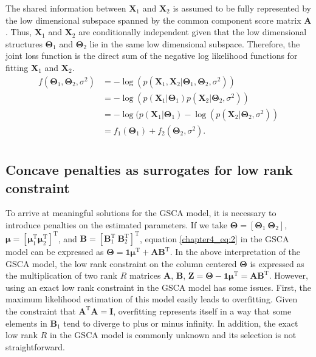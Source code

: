 The shared information between $\mathbf{X}_1$ and $\mathbf{X}_2$ is assumed to be fully represented by the low dimensional subspace spanned by the common component score matrix $\mathbf{A}$. Thus, $\mathbf{X}_1$ and $\mathbf{X}_2$ are conditionally independent given that the low dimensional structures $\mathbf{\Theta}_1$ and $\mathbf{\Theta}_2$ lie in the same low dimensional subspace. Therefore, the joint loss function is the direct sum of the negative log likelihood functions for fitting $\mathbf{X}_1$ and $\mathbf{X}_2$.
\begin{equation}\label{chapter4_eq:4}
\begin{aligned}
f(\mathbf{\Theta}_1,\mathbf{\Theta}_2,\sigma^2) &= -\log(p(\mathbf{X}_1,\mathbf{X}_2|\mathbf{\Theta}_1,\mathbf{\Theta}_2,\sigma^2))\\
& = -\log(p(\mathbf{X}_1|\mathbf{\Theta}_1) p(\mathbf{X}_2|\mathbf{\Theta}_2,\sigma^2))\\
              &= -\log(p(\mathbf{X}_1|\mathbf{\Theta}_1)-\log(p(\mathbf{X}_2|\mathbf{\Theta}_2,\sigma^2))\\
              &= f_1(\mathbf{\Theta}_1) + f_2(\mathbf{\Theta}_2,\sigma^2).\\
\end{aligned}
\end{equation}

\subsection{Concave penalties as surrogates for low rank constraint}
To arrive at meaningful solutions for the GSCA model, it is necessary to introduce penalties on the estimated parameters. If we take $\mathbf{\Theta} = [\mathbf{\Theta}_1 ~ \mathbf{\Theta}_2]$, $\bm{\mu} = [\bm{\mu}_1^{\text{T}} \bm{\mu}_2^{\text{T}}]^{\text{T}}$, and $\mathbf{B} = [\mathbf{B}_1^{\text{T}} ~ \mathbf{B}_2^{\text{T}}]^{\text{T}}$, equation \ref{chapter4_eq:2} in the GSCA model can be expressed as $\mathbf{\Theta} = \mathbf{1}\bm{\mu}^{\text{T}} + \mathbf{AB}^{\text{T}}$. In the above interpretation of the GSCA model, the low rank constraint on the column centered $\mathbf{\Theta}$ is expressed as the multiplication of two rank $R$ matrices $\mathbf{A}$, $\mathbf{B}$, $\mathbf{Z} = \mathbf{\Theta} - \mathbf{1}\bm{\mu}^{\text{T}} = \mathbf{AB}^{\text{T}}$. However, using an exact low rank constraint in the GSCA model has some issues. First, the maximum likelihood estimation of this model easily leads to overfitting. Given the constraint that $\mathbf{A}^{\text{T}}\mathbf{A}=\mathbf{I}$, overfitting represents itself in a way that some elements in $\mathbf{B}_1$ tend to diverge to plus or minus infinity. In addition, the exact low rank $R$ in the GSCA model is commonly unknown and its selection is not straightforward.

